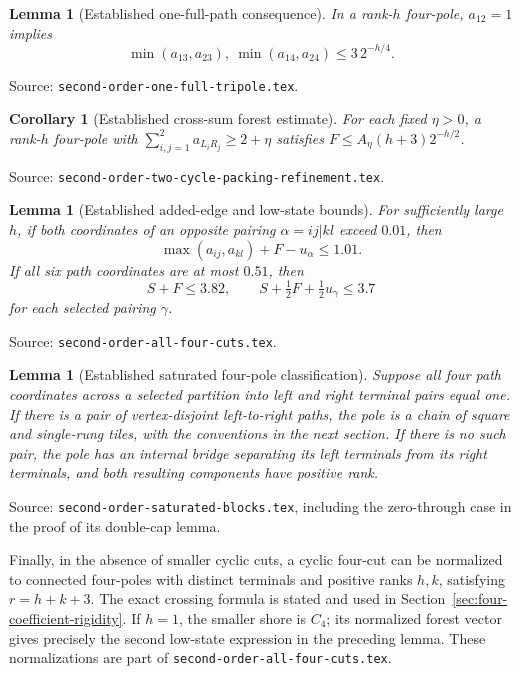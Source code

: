 \documentclass[11pt]{article}
\newtheorem{lemma}[theorem]{Lemma}
\newtheorem{corollary}[theorem]{Corollary}
\begin{document}
\begin{lemma}[Established one-full-path consequence]
\label{lem:one-full-tripole-small-adjacent}
In a rank-$h$ four-pole, $a_{12}=1$ implies
\[
 \min(a_{13},a_{23}),\ \min(a_{14},a_{24})\le3\,2^{-h/4}.
\]
\end{lemma}
Source: \nolinkurl{second-order-one-full-tripole.tex}.

\begin{corollary}[Established cross-sum forest estimate]
\label{cor:linear-four-pole-cross-sum-forest}
For each fixed $\eta>0$, a rank-$h$ four-pole with
$\sum_{i,j=1}^2a_{L_iR_j}\ge2+\eta$ satisfies
$F\le A_\eta(h+3)2^{-h/2}$.
\end{corollary}
Source: \nolinkurl{second-order-two-cycle-packing-refinement.tex}.

\begin{lemma}[Established added-edge and low-state bounds]
\label{lem:four-pole-added-edge}
For sufficiently large $h$, if both coordinates of an opposite pairing $\alpha=ij|kl$ exceed $0.01$, then
\[
 \max(a_{ij},a_{kl})+F-u_\alpha\le1.01.
\]
If all six path coordinates are at most $0.51$, then
\[
 S+F\le3.82,\qquad
 S+\tfrac12F+\tfrac12u_\gamma\le3.7
\]
for each selected pairing $\gamma$.
\end{lemma}
Source: \nolinkurl{second-order-all-four-cuts.tex}.

\begin{lemma}[Established saturated four-pole classification]
\label{lem:saturated-four-pole-double-cap}
Suppose all four path coordinates across a selected partition into left and right terminal pairs equal one.
If there is a pair of vertex-disjoint left-to-right paths, the pole is a chain of square and single-rung tiles, with the conventions in the next section.
If there is no such pair, the pole has an internal bridge separating its left terminals from its right terminals, and both resulting components have positive rank.
\end{lemma}
Source: \nolinkurl{second-order-saturated-blocks.tex}, including the zero-through case in the proof of its double-cap lemma.

Finally, in the absence of smaller cyclic cuts, a cyclic four-cut can be normalized to connected four-poles with distinct terminals and positive ranks $h,k$, satisfying $r=h+k+3$.
The exact crossing formula is stated and used in Section~\ref{sec:four-coefficient-rigidity}.
If $h=1$, the smaller shore is $C_4$; its normalized forest vector gives precisely the second low-state expression in the preceding lemma.
These normalizations are part of \nolinkurl{second-order-all-four-cuts.tex}.
\end{document}
